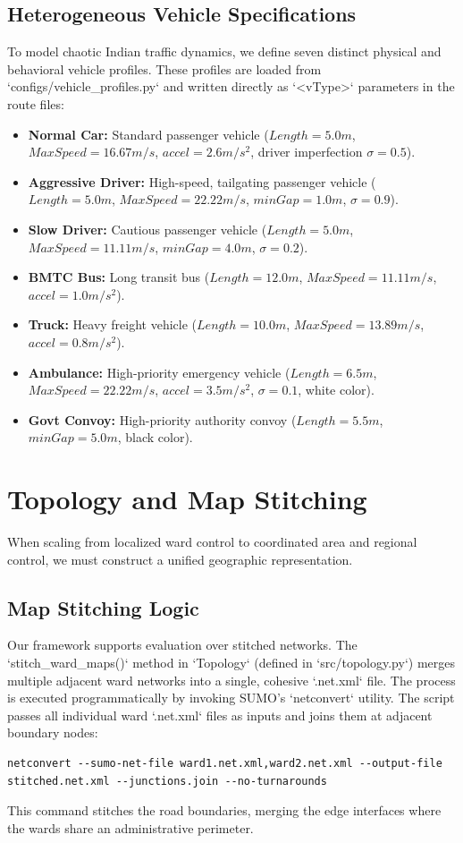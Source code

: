 \documentclass[conference]{IEEEtran}
\begin{document}
\subsection{Heterogeneous Vehicle Specifications}
To model chaotic Indian traffic dynamics, we define seven distinct physical and behavioral vehicle profiles. These profiles are loaded from `configs/vehicle_profiles.py` and written directly as `<vType>` parameters in the route files:
\begin{itemize}
    \item \textbf{Normal Car:} Standard passenger vehicle ($Length=5.0m$, $MaxSpeed=16.67m/s$, $accel=2.6m/s^2$, driver imperfection $\sigma=0.5$).
    \item \textbf{Aggressive Driver:} High-speed, tailgating passenger vehicle ($Length=5.0m$, $MaxSpeed=22.22m/s$, $minGap=1.0m$, $\sigma=0.9$).
    \item \textbf{Slow Driver:} Cautious passenger vehicle ($Length=5.0m$, $MaxSpeed=11.11m/s$, $minGap=4.0m$, $\sigma=0.2$).
    \item \textbf{BMTC Bus:} Long transit bus ($Length=12.0m$, $MaxSpeed=11.11m/s$, $accel=1.0m/s^2$).
    \item \textbf{Truck:} Heavy freight vehicle ($Length=10.0m$, $MaxSpeed=13.89m/s$, $accel=0.8m/s^2$).
    \item \textbf{Ambulance:} High-priority emergency vehicle ($Length=6.5m$, $MaxSpeed=22.22m/s$, $accel=3.5m/s^2$, $\sigma=0.1$, white color).
    \item \textbf{Govt Convoy:} High-priority authority convoy ($Length=5.5m$, $minGap=5.0m$, black color).
\end{itemize}

\section{Topology and Map Stitching}
When scaling from localized ward control to coordinated area and regional control, we must construct a unified geographic representation.

\subsection{Map Stitching Logic}
Our framework supports evaluation over stitched networks. The `stitch_ward_maps()` method in `Topology` (defined in `src/topology.py`) merges multiple adjacent ward networks into a single, cohesive `.net.xml` file.
The process is executed programmatically by invoking SUMO's `netconvert` utility. The script passes all individual ward `.net.xml` files as inputs and joins them at adjacent boundary nodes:
\begin{lstlisting}[basicstyle=\ttfamily\footnotesize, frame=single, breaklines=true]
netconvert --sumo-net-file ward1.net.xml,ward2.net.xml --output-file stitched.net.xml --junctions.join --no-turnarounds
\end{lstlisting}
This command stitches the road boundaries, merging the edge interfaces where the wards share an administrative perimeter.
\end{document}
